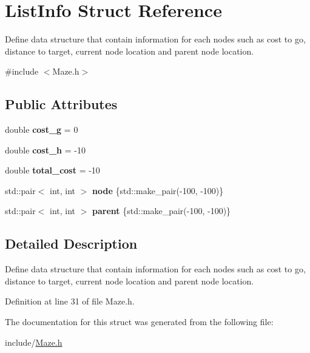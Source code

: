 \hypertarget{struct_list_info}{}\section{List\+Info Struct Reference}
\label{struct_list_info}


Define data structure that contain information for each nodes such as cost to go, distance to target, current node location and parent node location.  




{\ttfamily \#include $<$Maze.\+h$>$}

\subsection*{Public Attributes}
\begin{DoxyCompactItemize}
\item 
\mbox{\label{struct_list_info_ae2a5cc293d7613c307c171297610d6e8}} 
double {\bfseries cost\+\_\+g} = 0
\item 
\mbox{\label{struct_list_info_a1f35d1b6b763cf4d62437d374d7c9075}} 
double {\bfseries cost\+\_\+h} = -\/10
\item 
\mbox{\label{struct_list_info_a3706eaf80fd112887eb43fd2acb3608e}} 
double {\bfseries total\+\_\+cost} = -\/10
\item 
\mbox{\label{struct_list_info_a3424b1f3feb868327cc01976b80cd899}} 
std\+::pair$<$ int, int $>$ {\bfseries node} \{std\+::make\+\_\+pair(-\/100, -\/100)\}
\item 
\mbox{\label{struct_list_info_a8b6c0b30f22de4e48f12e234b22fdecb}} 
std\+::pair$<$ int, int $>$ {\bfseries parent} \{std\+::make\+\_\+pair(-\/100, -\/100)\}
\end{DoxyCompactItemize}


\subsection{Detailed Description}
Define data structure that contain information for each nodes such as cost to go, distance to target, current node location and parent node location. 

Definition at line 31 of file Maze.\+h.



The documentation for this struct was generated from the following file\+:\begin{DoxyCompactItemize}
\item 
include/\mbox{\hyperlink{_maze_8h}{Maze.\+h}}\end{DoxyCompactItemize}
